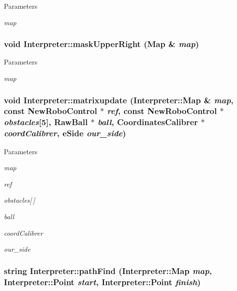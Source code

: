\begin{DoxyParams}{Parameters}
\item[{\em map}]\end{DoxyParams}
\hypertarget{classInterpreter_a6741607033424bb90e95e59311941ed3}{
\subsubsection[{maskUpperRight}]{\setlength{\rightskip}{0pt plus 5cm}void Interpreter::maskUpperRight ({\bf Map} \& {\em map})}}
\label{classInterpreter_a6741607033424bb90e95e59311941ed3}

\begin{DoxyParams}{Parameters}
\item[{\em map}]\end{DoxyParams}
\hypertarget{classInterpreter_a4b195c13b5189f82d5b2ccd47ee4c562}{
\subsubsection[{matrixupdate}]{\setlength{\rightskip}{0pt plus 5cm}void Interpreter::matrixupdate ({\bf Interpreter::Map} \& {\em map}, \/  const {\bf NewRoboControl} $\ast$ {\em ref}, \/  const {\bf NewRoboControl} $\ast$ {\em obstacles}\mbox{[}5\mbox{]}, \/  RawBall $\ast$ {\em ball}, \/  {\bf CoordinatesCalibrer} $\ast$ {\em coordCalibrer}, \/  eSide {\em our\_\-side})}}
\label{classInterpreter_a4b195c13b5189f82d5b2ccd47ee4c562}

\begin{DoxyParams}{Parameters}
\item[{\em map}]\item[{\em ref}]\item[{\em obstacles\mbox{[}$\,$\mbox{]}}]\item[{\em ball}]\item[{\em coordCalibrer}]\item[{\em our\_\-side}]\end{DoxyParams}
\hypertarget{classInterpreter_a253118e59d7428286ff70a818efe0c52}{
\subsubsection[{pathFind}]{\setlength{\rightskip}{0pt plus 5cm}string Interpreter::pathFind ({\bf Interpreter::Map} {\em map}, \/  {\bf Interpreter::Point} {\em start}, \/  {\bf Interpreter::Point} {\em finish})}}
\label{classInterpreter_a253118e59d7428286ff70a818efe0c52}

